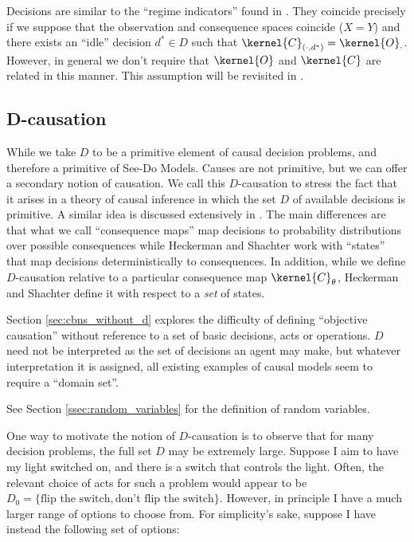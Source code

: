 Decisions are similar to the ``regime indicators'' found in \citet{dawid_decision-theoretic_2020}. They coincide precisely if we suppose that the observation and consequence spaces coincide ($X=Y$) and there exists an ``idle'' decision $d^*\in D$ such that $\kernel{C}_{(\cdot,d^*)} = \kernel{O}_{\cdot}$. However, in general we don't require that $\kernel{O}$ and $\kernel{C}$ are related in this manner. This assumption will be revisited in .

\subsection{D-causation}

While we take $D$ to be a primitive element of causal decision problems, and therefore a primitive of See-Do Models. Causes are not primitive, but we can offer a secondary notion of causation. We call this $D$-causation to stress the fact that it arises in a theory of causal inference in which the set $D$ of available decisions is primitive. A similar idea is discussed extensively in \citet{heckerman_decision-theoretic_1995}. The main differences are that what we call ``consequence maps'' map decisions to probability distributions over possible consequences while Heckerman and Shachter work with ``states'' that map decisions deterministically to consequences. In addition, while we define $D$-causation relative to a particular consequence map $\kernel{C}_\theta$, Heckerman and Shachter define it with respect to a \emph{set} of states.

Section \ref{sec:cbns_without_d} explores the difficulty of defining ``objective causation'' without reference to a set of basic decisions, acts or operations. $D$ need not be interpreted as the set of decisions an agent may make, but whatever interpretation it is assigned, all existing examples of causal models seem to require a ``domain set''.

See Section \ref{ssec:random_variables} for the definition of random variables.


One way to motivate the notion of $D$-causation is to observe that for many decision problems, the full set $D$ may be extremely large. Suppose I aim to have my light switched on, and there is a switch that controls the light. Often, the relevant choice of acts for such a problem would appear to be $D_0=\{\text{flip the switch},\text{don't flip the switch}\}$. However, in principle I have a much larger range of options to choose from. For simplicity's sake, suppose I have instead the following set of options:

